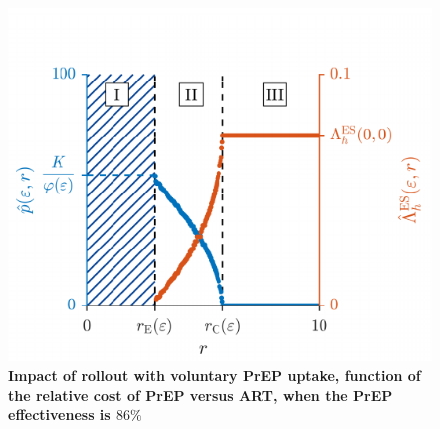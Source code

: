 \documentclass[12pt]{article}
\begin{document}
\newpage
\begin{figure}[H]	
\small	
\centering		
\includegraphics{Figures/Fig_S4}	
\caption[Impact of rollout with voluntary PrEP uptake, function of the relative cost of PrEP versus ART, when the PrEP effectiveness is $86\%$]{%
	\textbf{Impact of rollout with voluntary PrEP uptake, function of the relative cost of PrEP versus ART, when the PrEP effectiveness is $86\%$}\\
}
\end{figure}
\end{document}
